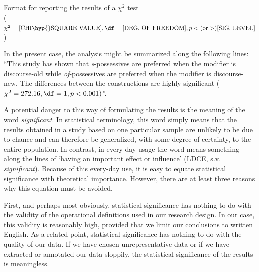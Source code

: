 \begin{exe}
\ex Format for reporting the results of a $\chi^2$  test\\
($\chi^2 = \text{[CHI\hyp{}SQUARE VALUE]}, \df = \text{[DEG. OF FREEDOM]}, p < (\text{or} >) \text{[SIG. LEVEL]}$)
\label{ex:reportingchisquare}
\end{exe}

In the present case, the analysis might be summarized along the following lines: ``This study has shown that \textit{s}-possessives  are preferred when the modifier is discourse\hyp{}old while \textit{of}-possessives are preferred when the modifier is discourse\hyp{}new. The differences between the constructions are highly significant  ($\chi^2 = 272.16, \df = 1, p < 0.001)$''.

A potential danger to this way of formulating the results is the meaning of the word \textit{significant}.  In statistical terminology, this word simply means that the results obtained in a study based on one particular sample are unlikely to be due to chance  and can therefore be generalized, with some degree of certainty, to the entire population. In contrast, in every\hyp{}day usage the word means something along the lines of `having an important effect or influence' (LDCE, s.v. \textit{significant}). Because of this every\hyp{}day use, it is easy to equate statistical significance  with theoretical importance. However, there are at least three reasons why this equation must be avoided.

First, and perhaps most obviously, statistical significance  has nothing to do with the validity  of the operational  definitions used in our research design.  In our case, this validity is reasonably high, provided that we limit our conclusions to written  English. As a related point, statistical significance  has nothing to do with the quality of our data. If we have chosen unrepresentative data or if we have extracted  or annotated  our data sloppily, the statistical significance of the results is meaningless.

